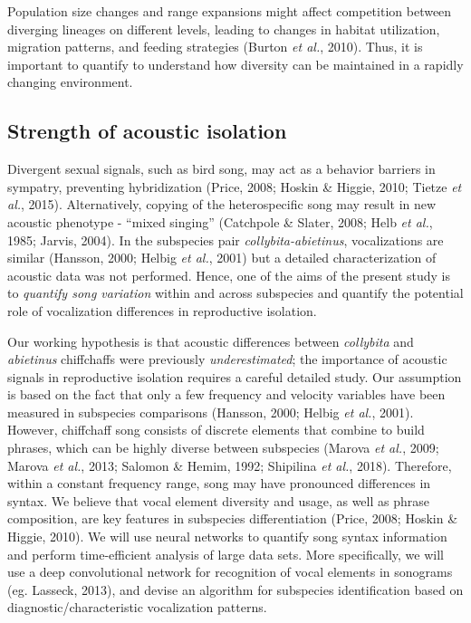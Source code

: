 \documentclass[11pt,a4paper]{article}
\begin{document}
Population size changes and range expansions might affect competition between diverging lineages on different levels, leading to changes in habitat utilization, migration patterns, and feeding strategies (Burton \textit{et al.}, 2010). Thus, it is important to quantify to understand how diversity can be maintained in a rapidly changing environment.
							

\subsection{Strength of acoustic isolation}

Divergent sexual signals, such as bird song, may act as a behavior barriers in sympatry, preventing hybridization (Price, 2008; Hoskin \& Higgie, 2010; Tietze \textit{et al.}, 2015). Alternatively, copying of the heterospecific song may result in new acoustic phenotype -  ``mixed singing'' (Catchpole \& Slater, 2008; Helb \textit{et al.}, 1985; Jarvis, 2004). In the subspecies pair \textit{collybita-abietinus}, vocalizations are similar (Hansson, 2000; Helbig \textit{et al.}, 2001) but a detailed characterization of acoustic data was not performed. Hence, one of the aims of the present study is to \textit{quantify song variation} within and across subspecies and quantify the potential role of vocalization differences in reproductive isolation. 

Our working hypothesis is that acoustic differences between \textit{collybita} and \textit{abietinus} chiffchaffs were previously \textit{underestimated}; the importance of acoustic signals in reproductive isolation requires a careful detailed study. Our assumption is based on the fact that only a few frequency and velocity variables have been measured in subspecies comparisons (Hansson, 2000; Helbig \textit{et al.}, 2001). However, chiffchaff song consists of discrete elements that combine to build phrases, which can be highly diverse between subspecies (Marova \textit{et al.}, 2009; Marova \textit{et al.}, 2013; Salomon \& Hemim, 1992; Shipilina \textit{et al.}, 2018). Therefore, within a constant frequency range, song may have pronounced differences in syntax. We believe that vocal element diversity and usage, as well as phrase composition, are key features in subspecies differentiation (Price, 2008; Hoskin \& Higgie, 2010).
We will use neural networks to quantify song syntax information and perform time-efficient analysis of large data sets. More specifically, we will use a deep convolutional network for recognition of vocal elements in sonograms (eg. Lasseck, 2013), and devise an algorithm for subspecies identification based on diagnostic/characteristic vocalization patterns.
\end{document}
